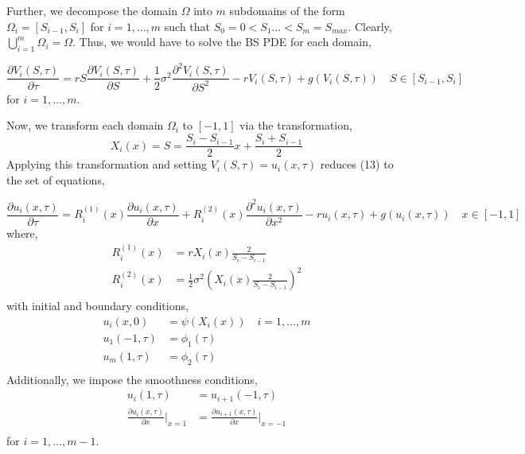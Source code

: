 \documentclass[a4paper,12pt]{article}
\begin{document}
Further, we decompose the domain $\Omega$ into $m$ subdomains of the form $\Omega_i = [S_{i-1}, S_i]$ for $i = 1, \dots, m$ such that $S_0 = 0 < S_1 \dots < S_m = S_{max}$. Clearly, $\bigcup_{i=1}^m \Omega_i = \Omega$. Thus, we would have to solve the BS PDE for each domain,

\begin{equation}
    \frac{\partial V_i(S, \tau)}{\partial \tau} = rS\frac{\partial V_i(S, \tau)}{\partial S} + \frac{1}{2}\sigma^2\frac{\partial^2 V_i(S, \tau)}{\partial S^2} - rV_i(S, \tau) + g(V_i(S,\tau)) \quad S \in [S_{i-1}, S_i]
\end{equation}
for $i = 1, \dots, m$.

Now, we transform each domain $\Omega_i$ to $[-1,1]$ via the transformation,
\begin{equation}
    X_i(x) = S = \frac{S_i - S_{i-1}}{2}x + \frac{S_i + S_{i-1}}{2}
\end{equation}
Applying this transformation and setting $V_i(S, \tau) = u_i(x, \tau)$ reduces (13) to the set of equations,

\begin{equation}
    \frac{\partial u_i(x, \tau)}{\partial \tau} = R_i^{(1)}(x)\frac{\partial u_i(x, \tau)}{\partial x} + R_i^{(2)}(x)\frac{\partial^2 u_i(x, \tau)}{\partial x^2} - ru_i(x, \tau) + g(u_i(x,\tau)) \quad x \in [-1,1]
\end{equation}
where,
\begin{equation}
    \begin{split}
        R_i^{(1)}(x) &= rX_i(x) \frac{2}{S_i - S_{i-1}}\\
        R_i^{(2)}(x) &= \frac{1}{2} \sigma^2 \left(X_i(x) \frac{2}{S_i - S_{i-1}}\right)^2\\
    \end{split}
\end{equation}
with initial and boundary conditions,
\begin{equation}
    \begin{split}
        u_i(x,0) &= \psi(X_i(x)) \quad i = 1, \dots, m\\
        u_1(-1, \tau) &= \phi_1(\tau)\\
        u_m(1, \tau) &= \phi_2(\tau)\\
    \end{split}
\end{equation}
Additionally, we impose the smoothness conditions,
\begin{equation}
    \begin{split}
        u_i(1, \tau) &= u_{i+1}(-1,\tau) \\
        \frac{\partial u_i (x,\tau)}{\partial x}|_{x = 1} &= \frac{\partial u_{i+1} (x,\tau)}{\partial x}|_{x = -1}\\
    \end{split}
\end{equation}
for $i = 1, \dots, m-1$.
\end{document}
